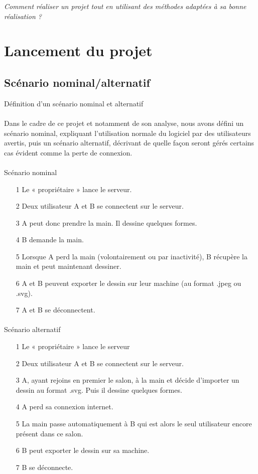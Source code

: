 \documentclass[a4paper,11pt]{article}
\begin{document}
\textit{Comment réaliser un projet tout en utilisant des méthodes adaptées à sa bonne réalisation ?}


\section{Lancement du projet}
\subsection{Scénario nominal/alternatif}
Définition d'un scénario nominal et alternatif

\paragraph{} Dans le cadre de ce projet et notamment de son analyse, nous avons défini un scénario nominal, expliquant l'utilisation normale du logiciel par des utilisateurs avertis, puis un scénario alternatif, décrivant de quelle façon seront gérés certains cas évident comme la perte de connexion.

\paragraph{} Scénario nominal

\begin{itemize}
	\item[1]Le « propriétaire » lance le serveur.
	\item[2]Deux utilisateur A et B se connectent sur le serveur.
	\item[3]A peut donc prendre la main. Il dessine quelques formes.
	\item[4]B demande la main.
	\item[5]Lorsque A perd la main (volontairement ou par inactivité), B récupère la main et peut maintenant dessiner.
	\item[6]A et B peuvent exporter le dessin sur leur machine (au format .jpeg ou .svg).
	\item[7]A et B se déconnectent.
\end{itemize}

\paragraph{} Scénario alternatif

\begin{itemize}
	\item[1]Le « propriétaire » lance le serveur
	\item[2]Deux utilisateur A et B se connectent sur le serveur.
	\item[3]A, ayant rejoins en premier le salon, à la main et décide d'importer un dessin au format .svg. Puis il dessine quelques formes.
	\item[4]A perd sa connexion internet.
	\item[5]La main passe automatiquement à B qui est alors le seul utilisateur encore présent dans ce salon.
	\item[6]B peut exporter le dessin sur sa machine.
	\item[7]B se déconnecte.
\end{itemize}
\end{document}
